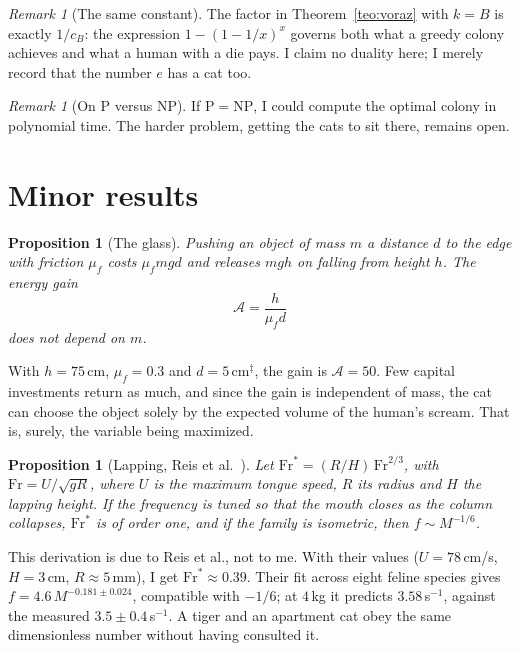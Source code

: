 \documentclass[11pt,a4paper]{article}
\theoremstyle{plain}
\newtheorem{proposicion}[teorema]{Proposition}
\theoremstyle{definition}
\theoremstyle{remark}
\newtheorem{observacion}[teorema]{Remark}
\numberwithin{equation}{section}
\newcommand{\calib}{{\ensuremath{^{\ddagger}}}}
\begin{document}
\begin{observacion}[The same constant]
The factor in Theorem~\ref{teo:voraz} with $k=B$ is exactly $1/c_B$: the expression $1-(1-1/x)^x$ governs both what a greedy colony achieves and what a human with a die pays. I claim no duality here; I merely record that the number $e$ has a cat too.
\end{observacion}

\begin{observacion}[On P versus NP]
If $\mathrm{P}=\mathrm{NP}$, I could compute the optimal colony in polynomial time. The harder problem, getting the cats to sit there, remains open.
\end{observacion}

\section{Minor results}\label{sec:menores}

\begin{proposicion}[The glass]\label{prop:vaso}
Pushing an object of mass $m$ a distance $d$ to the edge with friction $\mu_f$ costs $\mu_f mgd$ and releases $mgh$ on falling from height $h$. The energy gain
\begin{equation}
  \mathcal A=\frac{h}{\mu_f d}
\end{equation}
does not depend on $m$.
\end{proposicion}

With $h=75$\,cm, $\mu_f=0.3$ and $d=5$\,cm\calib, the gain is $\mathcal A=50$. Few capital investments return as much, and since the gain is independent of mass, the cat can choose the object solely by the expected volume of the human's scream. That is, surely, the variable being maximized.

\begin{proposicion}[Lapping, Reis et al.~\cite{reis}]\label{prop:lengua}
Let $\mathrm{Fr}^{*}=(R/H)\,\mathrm{Fr}^{2/3}$, with $\mathrm{Fr}=U/\sqrt{gR}$, where $U$ is the maximum tongue speed, $R$ its radius and $H$ the lapping height. If the frequency is tuned so that the mouth closes as the column collapses, $\mathrm{Fr}^{*}$ is of order one, and if the family is isometric, then $f\sim M^{-1/6}$.
\end{proposicion}

This derivation is due to Reis et al., not to me. With their values ($U=78$\,cm/s, $H=3$\,cm, $R\approx 5$\,mm), I get $\mathrm{Fr}^{*}\approx 0.39$. Their fit across eight feline species gives $f=4.6\,M^{-0.181\pm 0.024}$, compatible with $-1/6$; at $4$\,kg it predicts $3.58$\,s$^{-1}$, against the measured $3.5\pm0.4$\,s$^{-1}$. A tiger and an apartment cat obey the same dimensionless number without having consulted it.
\end{document}
